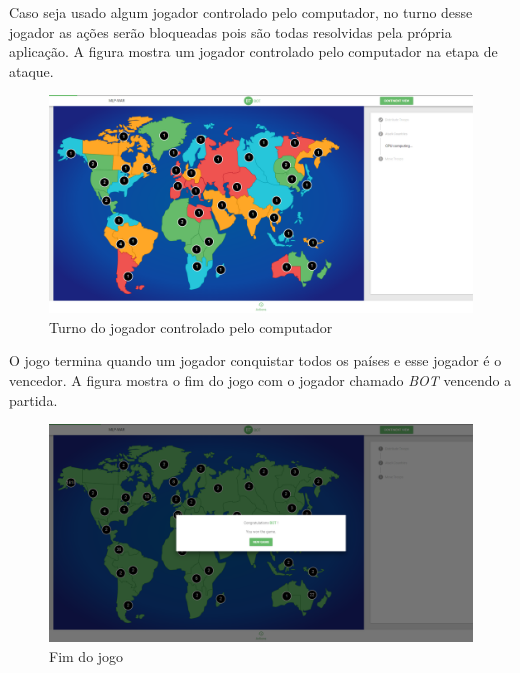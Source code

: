 \documentclass[rel_mlp]{iiufrgs}
\begin{document}
Caso seja usado algum jogador controlado pelo computador, no turno desse jogador as ações serão bloqueadas pois são todas resolvidas pela própria aplicação.
A figura \label{fig:bot} mostra um jogador controlado pelo computador na etapa de ataque.

\begin{figure}[h!]
\centering
  \includegraphics[width=1.0\textwidth]{images/bot.png}
  \caption{Turno do jogador controlado pelo computador}
  \label{fig:bot}
\end{figure}

O jogo termina quando um jogador conquistar todos os países e esse jogador é o vencedor.
A figura \label{fig:endGame} mostra o fim do jogo com o jogador chamado \textit{BOT} vencendo a partida.

\begin{figure}[h!]
\centering
  \includegraphics[width=1.0\textwidth]{images/endGame.png}
  \caption{Fim do jogo}
  \label{fig:endGame}
\end{figure}
\end{document}
